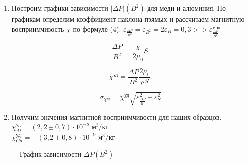 \documentclass[a4paper, 12pt]{article}%
\begin{document}
\begin{enumerate}
	
	\item Построим графики зависимости $|\Delta P| (B^2)$ для меди и алюминия. По графикам определим коэффициент наклона прямых и рассчитаем магнитную восприимчивость $\chi$ по формуле (4). $\varepsilon_{	\frac{\Delta P}{B^2}} = \varepsilon_{B^2} = 2\varepsilon_{B} = 0,3 >> \varepsilon_{\frac{\Delta P}{B^2}}^{\text{мнк}}$
	
	\begin{equation}
		\frac{\Delta P}{B^2} = \frac{\chi}{2\mu_0}S.
	\end{equation}

	\begin{equation}
		\chi^{\text{уд}} = \frac{\Delta P}{B^2}\frac{2\mu_0}{\rho S}.
	\end{equation}

	\begin{equation}
		\sigma_{\chi^{\text{уд}}} = \chi^{\text{уд}}\sqrt{\varepsilon_{\frac{\Delta P}{B^2}}^2 + \varepsilon_S^2}
	\end{equation}
	
	\item Получим значения магнитной восприимчивости для наших образцов.\\	$\chi_{Al}^{\text{уд}} = (2,2 \pm 0,7) \cdot 10^{-8}$ м$^3$/кг\\
	$\chi_{Cu}^{\text{уд}} = -(3,2 \pm 0,8) \cdot 10^{-9}$ м$^3$/кг
	 
	\end{enumerate}
	 
	\begin{figure}[h]
		\caption{График зависимости $\Delta P (B^2)$}
	\end{figure}
	
\end{document}

